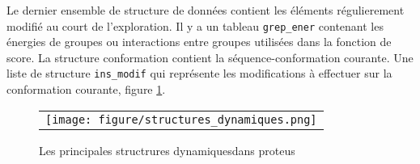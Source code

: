 Le dernier ensemble de structure de données contient les éléments régulierement modifié au court de l'exploration.
Il y a un tableau  \verb!grep_ener! contenant les énergies de groupes ou interactions entre groupes utilisées dans la fonction de score. La structure conformation contient la séquence-conformation courante. Une liste de structure \verb!ins_modif! qui représente les modifications à effectuer sur la conformation courante, figure \ref{fig:structDyna}.  

   \begin{figure}[!htbp]
     \centering
     \begin{tabular}{c}
       \texttt{[image: figure/structures\_dynamiques.png]} 
     \end{tabular}
     
     \caption{Les principales structrures \og dynamiques\fg dans proteus}
\label{fig:structDyna}
   \end{figure}




